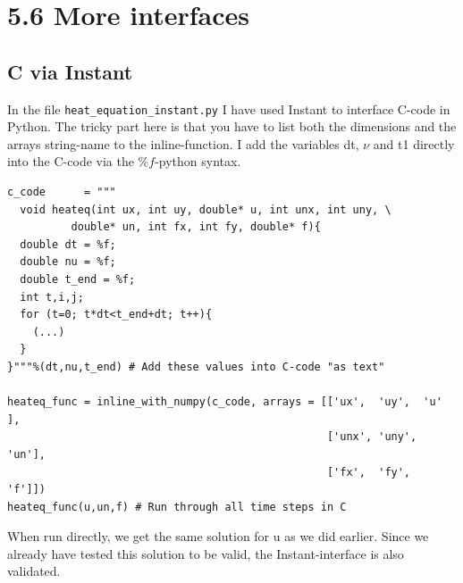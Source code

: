 \documentclass[a4paper]{article}
\begin{document}
\section*{5.6 More interfaces}
\subsection*{C via Instant}
In the file \texttt{heat\_equation\_instant.py} I have used Instant to interface C-code in Python. The tricky part here is that you have to list both the dimensions and the arrays string-name to the inline-function. I add the variables dt, $\nu$ and t1 directly into the C-code via the $\%f$-python syntax.

\begin{verbatim}
c_code      = """
  void heateq(int ux, int uy, double* u, int unx, int uny, \
	      double* un, int fx, int fy, double* f){
  double dt = %f;
  double nu = %f;
  double t_end = %f;
  int t,i,j;
  for (t=0; t*dt<t_end+dt; t++){
    (...)
  }
}"""%(dt,nu,t_end) # Add these values into C-code "as text"

heateq_func = inline_with_numpy(c_code, arrays = [['ux',  'uy',  'u' ],
                                                  ['unx', 'uny', 'un'],
                                                  ['fx',  'fy',  'f']])
heateq_func(u,un,f) # Run through all time steps in C
\end{verbatim}

When run directly, we get the same solution for u as we did earlier. Since we already have tested this solution to be valid, the Instant-interface is also validated. 
\end{document}
